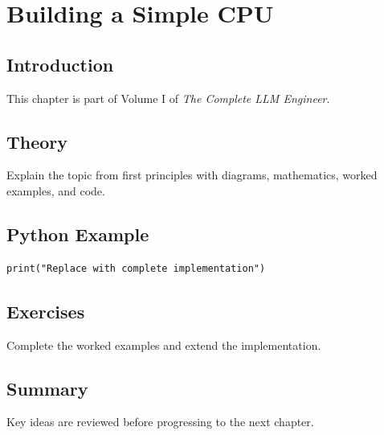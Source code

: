 \chapter{Building a Simple CPU}
\label{chap:building-a-simple-cpu}



\section{Introduction}
This chapter is part of Volume I of \emph{The Complete LLM Engineer}.

\section{Theory}
Explain the topic from first principles with diagrams, mathematics, worked examples,
and code.

\section{Python Example}
\begin{lstlisting}
print("Replace with complete implementation")
\end{lstlisting}

\section{Exercises}
\begin{exercise}
Complete the worked examples and extend the implementation.
\end{exercise}

\section{Summary}
Key ideas are reviewed before progressing to the next chapter.

